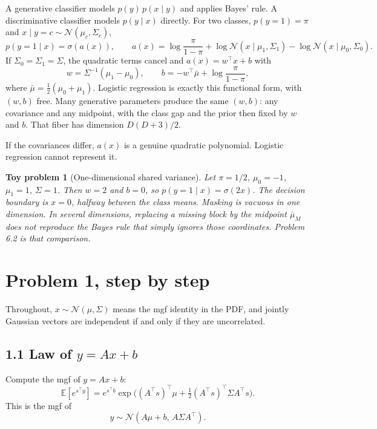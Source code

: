 \documentclass[11pt]{article}
\newtheorem{toy}{Toy problem}
\theoremstyle{remark}
\newcommand{\E}{\mathbb{E}}
\newcommand{\N}{\mathcal{N}}
\begin{document}
A generative classifier models \(p(y)\,p(x\mid y)\) and applies Bayes' rule. A discriminative classifier models \(p(y\mid x)\) directly. For two classes, \(p(y=1)=\pi\) and \(x\mid y=c\sim\N(\mu_c,\Sigma_c)\),
\[
p(y=1\mid x)=\sigma(a(x)),\qquad
a(x)=\log\frac{\pi}{1-\pi}+\log\N(x\mid\mu_1,\Sigma_1)-\log\N(x\mid\mu_0,\Sigma_0).
\]
If \(\Sigma_0=\Sigma_1=\Sigma\), the quadratic terms cancel and \(a(x)=w^\top x+b\) with
\[
w=\Sigma^{-1}(\mu_1-\mu_0),\qquad
b=-w^\top\bar\mu+\log\frac{\pi}{1-\pi},
\]
where \(\bar\mu=\tfrac12(\mu_0+\mu_1)\). Logistic regression is exactly this functional form, with \((w,b)\) free. Many generative parameters produce the same \((w,b)\): any covariance and any midpoint, with the class gap and the prior then fixed by \(w\) and \(b\). That fiber has dimension \(D(D+3)/2\).

If the covariances differ, \(a(x)\) is a genuine quadratic polynomial. Logistic regression cannot represent it.

\begin{toy}[One-dimensional shared variance]
Let \(\pi=1/2\), \(\mu_0=-1\), \(\mu_1=1\), \(\Sigma=1\). Then \(w=2\) and \(b=0\), so \(p(y=1\mid x)=\sigma(2x)\). The decision boundary is \(x=0\), halfway between the class means. Masking is vacuous in one dimension. In several dimensions, replacing a missing block by the midpoint \(\bar\mu_M\) does \emph{not} reproduce the Bayes rule that simply ignores those coordinates. Problem 6.2 is that comparison.
\end{toy}

\newpage
\section{Problem 1, step by step}

Throughout, \(x\sim\N(\mu,\Sigma)\) means the mgf identity in the PDF, and jointly Gaussian vectors are independent if and only if they are uncorrelated.

\subsection*{1.1 Law of \texorpdfstring{\(y=Ax+b\)}{y = Ax + b}}

Compute the mgf of \(y=Ax+b\):
\[
\E[e^{s^\top y}]
=e^{s^\top b}\exp\big((A^\top s)^\top\mu+\tfrac12(A^\top s)^\top\Sigma A^\top s\big).
\]
This is the mgf of
\[
\boxed{y\sim\N(A\mu+b,\,A\Sigma A^\top)}.
\]
\end{document}
